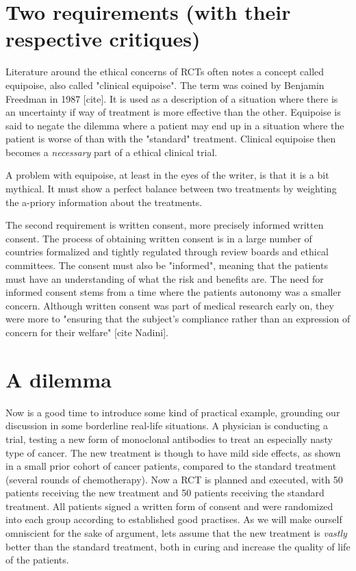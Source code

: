\documentclass[12p]{article}
\begin{document}
\section*{Two requirements (with their respective critiques)}

Literature around the ethical concerns of RCTs often notes a concept called equipoise, also called "clinical equipoise".
The term was coined by Benjamin Freedman in 1987 [cite].
It is used as a description of a situation where there is an uncertainty if way of treatment is more effective than the other.
Equipoise is said to negate the dilemma where a patient may end up in a situation where the patient is worse of than with the "standard" treatment.
Clinical equipoise then becomes a \emph{necessary} part of a ethical clinical trial.

A problem with equipoise, at least in the eyes of the writer, is that it is a bit mythical.
It must show a perfect balance between two treatments by weighting the a-priory information about the treatments.


The second requirement is written consent, more precisely informed written consent.
The process of obtaining written consent is in a large number of countries formalized and tightly regulated through review boards and ethical committees.
The consent must also be "informed", meaning that the patients must have an understanding of what the risk and benefits are.
The need for informed consent stems from a time where the patients autonomy was a smaller concern.
Although written consent was part of medical research early on, they were more to "ensuring that the subject's compliance rather than an expression of concern for their welfare" [cite Nadini].


\section*{A dilemma}

Now is a good time to introduce some kind of practical example, grounding our discussion in some borderline real-life situations.
A physician is conducting a trial, testing a new form of monoclonal antibodies to treat an especially nasty type of cancer.
The new treatment is though to have mild side effects, as shown in a small prior cohort of cancer patients, compared to the standard treatment (several rounds of chemotherapy).
Now a RCT is planned and executed, with 50 patients receiving the new treatment and 50 patients receiving the standard treatment.
All patients signed a written form of consent and were randomized into each group according to established good practises.
As we will make ourself omniscient for the sake of argument, lets assume that the new treatment is \emph{vastly} better than the standard treatment, both in curing and increase the quality of life of the patients.
\end{document}

